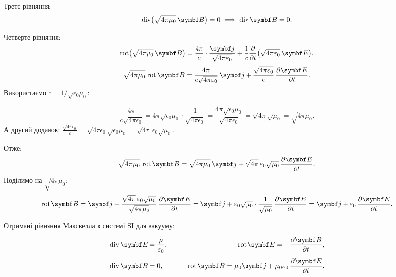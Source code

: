 Третє рівняння:
\begin{equation*}
	\Div\bigl( \sqrt{4\pi\mu_0}\,\Bfield \bigr) = 0 \;\Longrightarrow\; \Div\Bfield = 0.
\end{equation*}

\noindent Четверте рівняння:
\begin{equation*}
	\Rot\bigl( \sqrt{4\pi\mu_0}\,\Bfield \bigr) = \frac{4\pi}{c}\cdot\frac{\vect{j}}{\sqrt{4\pi\epsilon_0}} + \frac{1}{c}\frac{\partial}{\partial t}\bigl( \sqrt{4\pi\epsilon_0}\,\Efield \bigr).
\end{equation*}
\begin{equation*}
	\sqrt{4\pi\mu_0}\,\Rot\Bfield = \frac{4\pi}{c\sqrt{4\pi\epsilon_0}}\,\vect{j} + \frac{\sqrt{4\pi\epsilon_0}}{c}\,\frac{\partial \Efield}{\partial t}.
\end{equation*}
Використаємо \(c = 1/\sqrt{\epsilon_0\mu_0}\):

\begin{equation*}
	\frac{4\pi}{c\sqrt{4\pi\epsilon_0}} = 4\pi\sqrt{\epsilon_0\mu_0}\cdot\frac{1}{\sqrt{4\pi\epsilon_0}} = \frac{4\pi\sqrt{\epsilon_0\mu_0}}{\sqrt{4\pi\epsilon_0}} = \sqrt{4\pi}\sqrt{\mu_0} = \sqrt{4\pi\mu_0}.
\end{equation*}
А другий доданок: \(\frac{\sqrt{4\pi\epsilon_0}}{c} = \sqrt{4\pi\epsilon_0}\sqrt{\epsilon_0\mu_0} = \sqrt{4\pi}\,\epsilon_0\sqrt{\mu_0}\).

Отже:
\begin{equation*}
	\sqrt{4\pi\mu_0}\,\Rot\Bfield = \sqrt{4\pi\mu_0}\,\vect{j} + \sqrt{4\pi}\,\epsilon_0\sqrt{\mu_0}\,\frac{\partial \Efield}{\partial t}.
\end{equation*}
Поділимо на \(\sqrt{4\pi\mu_0}\):
\begin{equation*}
	\Rot\Bfield = \vect{j} + \frac{\sqrt{4\pi}\,\epsilon_0\sqrt{\mu_0}}{\sqrt{4\pi\mu_0}}\,\frac{\partial \Efield}{\partial t}
	= \vect{j} + \epsilon_0\sqrt{\mu_0}\cdot\frac{1}{\sqrt{\mu_0}}\,\frac{\partial \Efield}{\partial t}
	= \vect{j} + \epsilon_0\,\frac{\partial \Efield}{\partial t}.
\end{equation*}

Отримані рівняння Максвелла в системі SI для вакууму:

\begin{equation*}
	\begin{aligned}
		 & \Div\Efield = \frac{\rho}{\epsilon_0}, \qquad
		 & \Rot\Efield = -\frac{\partial \Bfield}{\partial t},                                    \\[4pt]
		 & \Div\Bfield = 0, \qquad
		 & \Rot\Bfield = \mu_0\vect{j} + \mu_0\epsilon_0\,\frac{\partial \Efield}{\partial t}.
	\end{aligned}
\end{equation*}


